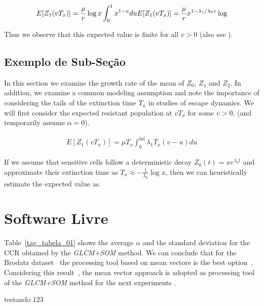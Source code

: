 \documentclass{classe_cn}                 %
\begin{document}
\begin{equation}
  E [Z_1(vT_x)] = \frac{\mu}{r}\log x \int_0^{1} x^{1-u} du \\
  E [Z_1(vT_x)] = \frac{\mu}{r}x^{1-{\lambda_1}/{\lambda_0}v}\log 
\end{equation}

Thus we observe that this expected value is finite for all $v>0$ (also see \cite{Rosenfeld:1970}).

\subsection{Exemplo de Sub-Seção}

In this section we examine the growth rate of the mean of $Z_0$, $Z_1$ and $Z_2$. In addition, we examine a common modeling assumption and note the importance of considering the tails of the extinction time $T_x$ in studies of escape dynamics. We will first consider the expected resistant population at $vT_x$ for some $v>0$, (and temporarily assume $\alpha=0$).

\begin{eqnarray}
E [Z_1(vT_x)]= \mu T_x \int_{0}^{\inf} \lambda_1T_x(v-u)du
\end{eqnarray}

If we assume that sensitive cells follow a deterministic decay $Z_0(t)=xe^{\lambda_0 t}$ and approximate their extinction time as $T_x\approx-\frac{1}{\lambda_0}\log x$, then we can heuristically estimate the expected value as.

\section{Software Livre}

Table~\ref{tag_tabela_01} shows the average $ \alpha $ and the standard deviation for the CCR \cite{Rosenfeld:1970} obtained by the \textit{GLCM+SOM} method. We can conclude that for the Brodatz dataset~\cite{Domingues:2010} the processing tool based on mean vectors is the best option~\cite{Rosenfeld:1970, Diday:1989}. Considering this result~\cite{Visible:2013}, the mean vector approach is adopted as processing tool of the \textit{GLCM+SOM} method for the next experiments \cite{Fulano:2009}.

testando 123
\end{document}
